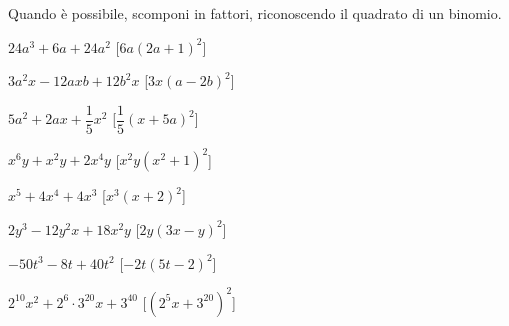 \begin{esercizio}[\Ast]
\label{ese:div.021}
Quando è possibile, scomponi in fattori, riconoscendo il quadrato di un binomio.
\begin{multicols}{2}
\begin{enumeratea}
 \item $24a^{3}+6a+24a^{2}$ \hfill [$6a(2a+1)^{2}$]
 \item $3a^{2}x-12axb+12b^{2}x$ \hfill [$3x(a-2b)^{2}$]
 \item $5a^{2}+2ax+\dfrac{1}{5}x^{2}$ \hfill [$\dfrac{1}{5}(x+5a)^{2}$]
 \item $x^{6}y+x^{2}y+2x^{4}y$ \hfill [$x^{2}y\left(x^{2}+1\right)^{2}$]
 \item $x^{5}+4x^{4}+4x^{3}$ \hfill [$x^{3}(x+2)^{2}$]
 \item $2y^{3}-12y^{2}x+18x^{2}y$ \hfill [$2y(3x-y)^{2}$]
 \item $-50t^{3}-8t+40t^{2}$ \hfill [$-2t(5t-2)^{2}$]
 \item $2^{10}x^{2}+2^{6}\cdot 3^{20}x+3^{40}$ 
  \hfill [$\left(2^{5}x+3^{20}\right)^{2}$]
\end{enumeratea}
\end{multicols}
\end{esercizio}


\paragraph*{}

